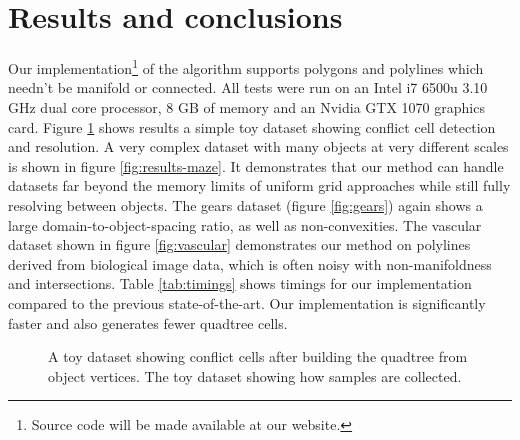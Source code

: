 \documentclass[final,3p,times,twocolumn]{elsarticle}
\begin{document}
\section{Results and conclusions}
Our  implementation\footnote{
Source code will be made available at our website. %
}
of the algorithm supports polygons and polylines which needn't be manifold or connected. All tests were run on
 an Intel i7 6500u 3.10 GHz dual core processor, 8 GB of memory and an Nvidia GTX 1070 graphics card. Figure \ref{fig:results-toy} shows results a simple toy dataset showing conflict cell detection and resolution. A very complex dataset with many objects at very different scales is shown in figure \ref{fig:results-maze}. It demonstrates that our method can handle datasets far beyond the memory limits of uniform grid approaches while still fully resolving between objects. The gears dataset (figure \ref{fig:gears}) again shows a large domain-to-object-spacing ratio, as well as non-convexities. The vascular dataset shown in figure \ref{fig:vascular} demonstrates our method on polylines derived from biological image data, which is often noisy with non-manifoldness and intersections. Table \ref{tab:timings} shows timings for our implementation compared to the previous state-of-the-art. Our implementation is significantly faster and also generates fewer quadtree cells. 

\begin{figure}
  \centering

  \caption{
    \protect{} A toy dataset showing conflict cells after building the quadtree from object vertices.
    \protect{} The toy dataset showing how samples are collected.
  }
  \label{fig:results-toy}
\end{figure}
\end{document}

